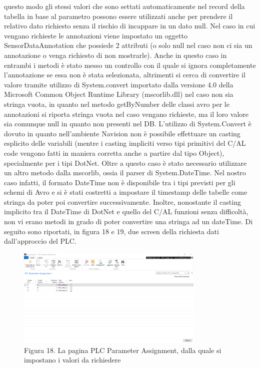 questo modo gli stessi valori che sono settati automaticamente nel record della tabella in base al parametro possono essere utilizzati anche per prendere il relativo dato richiesto senza il rischio di incappare in un dato null. Nel caso in cui vengano richieste le annotazioni viene impostato un oggetto SensorDataAnnotation che possiede 2 attributi (o solo null nel caso non ci sia un annotazione o venga richiesto di non mostrarle). Anche in questo caso in entrambi i metodi è stato messo un controllo con il quale si ignora completamente l’annotazione se essa non è stata selezionata, altrimenti si cerca di convertire il valore tramite utilizzo di System.convert importato dalla versione 4.0 della Microsoft Common Object Runtime Library (mscorlib.dll) nel caso non sia stringa vuota, in quanto nel metodo getByNumber delle classi avro per le annotazioni si riporta stringa vuota nel caso vengano richieste, ma il loro valore sia comunque null in quanto non presenti nel DB. L’utilizzo di System.Convert è dovuto in quanto nell’ambiente Navision non è possibile effettuare un casting esplicito delle variabili (mentre i casting impliciti verso tipi primitivi del C/AL code vengono fatti in maniera corretta anche a partire dal tipo Object), specialmente per i tipi DotNet. Oltre a questo caso è stato necessario utilizzare un altro metodo dalla mscorlib, ossia il parser di System.DateTime. Nel nostro caso infatti, il formato DateTime non è disponibile tra i tipi previsti per gli schemi di Avro e si è stati costretti a impostare il timestamp delle tabelle come stringa da poter poi convertire successivamente. Inoltre, nonostante il casting implicito tra il DateTime di DotNet e quello del C/AL funzioni senza difficoltà, non vi erano metodi in grado di poter convertire una stringa ad un dateTime. Di seguito sono riportati, in figura 18 e 19, due screen della richiesta dati dall'approccio del PLC.
\clearpage
\begin{figure}[ht]
	\centering
	\includegraphics[width=0.8\textwidth]{PLC-Assigment-List.png}
	\caption*{Figura 18. La pagina PLC Parameter Assignment, dalla quale si impostano i valori da richiedere}
\end{figure}

